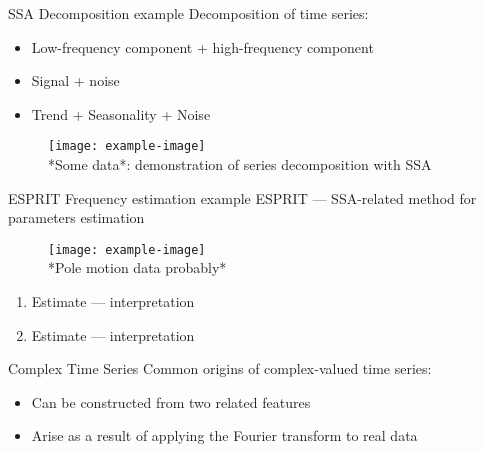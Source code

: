 \documentclass[pdf, unicode, ucs, notheorems]{beamer}
\newcommand{\bluetext}[1]{{\usebeamercolor[fg]{bluetext_color}#1}}
\theoremstyle{definition}
\begin{document}
\begin{frame}{SSA Decomposition example}
  Decomposition of time series:
  \begin{itemize}
    \item Low-frequency component + high-frequency component
    \item \bluetext{Signal + noise}
    \item Trend + Seasonality + Noise
  \end{itemize}

  \begin{figure}[!ht]
    \center
    \texttt{[image: example-image]}\\
    *Some data*: demonstration of series decomposition with SSA
  \end{figure}
\end{frame}

\begin{frame}{ESPRIT Frequency estimation example}
  ESPRIT --- SSA-related method for parameters estimation

  \begin{figure}[!ht]
    \centering
    \texttt{[image: example-image]}\\
    *Pole motion data probably*
  \end{figure}

  \begin{enumerate}
    \item Estimate --- interpretation
    \item Estimate --- interpretation
  \end{enumerate}
\end{frame}

\begin{frame}{Complex Time Series}
  Common origins of complex-valued time series:
  \begin{itemize}
    \item Can be constructed from two related features
    \item Arise as a result of applying the Fourier transform to real data
  \end{itemize}
\end{frame}
\end{document}
